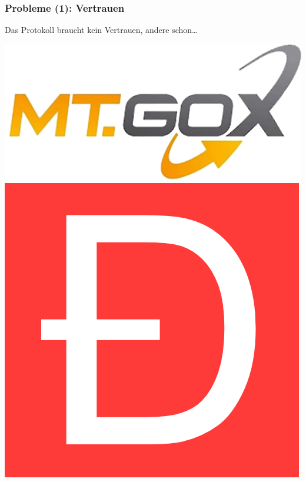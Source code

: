 \documentclass[aspectratio=169,x11names]{beamer}
\begin{document}
\begin{frame}
\frametitle{Probleme (1): Vertrauen}
Das Protokoll braucht kein Vertrauen, andere schon\dots\pause 
\bigskip\bigskip

\begin{center}
\includegraphics[scale=1]{images/mtgox.png} \qquad\qquad
\includegraphics[scale=0.15]{images/DAO-logo.png} 
\end{center}
\end{frame}

\end{document}
